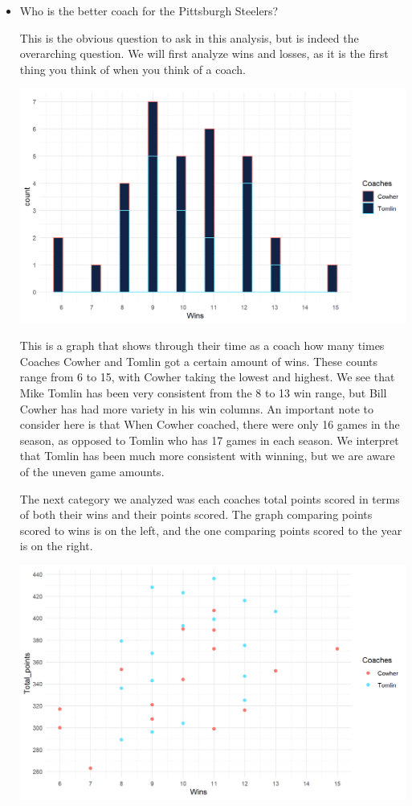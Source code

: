\documentclass[
  letterpaper,
  DIV=11,
  numbers=noendperiod]{scrartcl}
\begin{document}
\begin{itemize}
\item
  Who is the better coach for the Pittsburgh Steelers?

  This is the obvious question to ask in this analysis, but is indeed
  the overarching question. We will first analyze wins and losses, as it
  is the first thing you think of when you think of a coach.

  \includegraphics{images/clipboard-4000230535.png}

  This is a graph that shows through their time as a coach how many
  times Coaches Cowher and Tomlin got a certain amount of wins. These
  counts range from 6 to 15, with Cowher taking the lowest and highest.
  We see that Mike Tomlin has been very consistent from the 8 to 13 win
  range, but Bill Cowher has had more variety in his win columns. An
  important note to consider here is that When Cowher coached, there
  were only 16 games in the season, as opposed to Tomlin who has 17
  games in each season. We interpret that Tomlin has been much more
  consistent with winning, but we are aware of the uneven game amounts.

  The next category we analyzed was each coaches total points scored in
  terms of both their wins and their points scored. The graph comparing
  points scored to wins is on the left, and the one comparing points
  scored to the year is on the right.

  \includegraphics{images/clipboard-3424389474.png}


\end{itemize}
\end{document}
